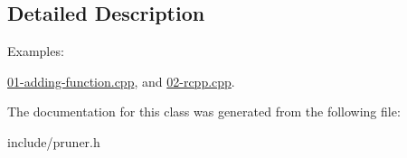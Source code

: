 \subsection{Detailed Description}
\begin{Desc}
\item[Examples\+: ]\par
\hyperlink{01-adding-function_8cpp-example}{01-\/adding-\/function.\+cpp}, and \hyperlink{02-rcpp_8cpp-example}{02-\/rcpp.\+cpp}.\end{Desc}


The documentation for this class was generated from the following file\+:\begin{DoxyCompactItemize}
\item 
include/pruner.\+h\end{DoxyCompactItemize}

